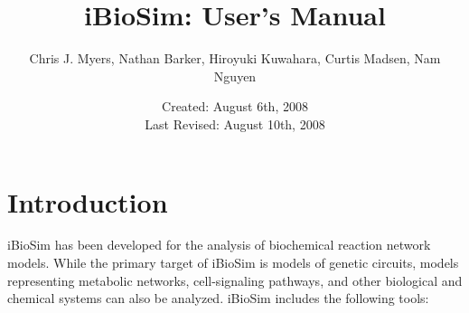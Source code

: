 \documentclass[titlepage,11pt]{article}
\title{iBioSim: User's Manual}
\author{Chris J. Myers, Nathan Barker, Hiroyuki Kuwahara, Curtis
  Madsen, Nam Nguyen}
\date{Created: August 6th, 2008\\
  Last Revised: August 10th, 2008
}
\begin{document}
\maketitle

  
\tableofcontents

\clearpage
  

\section{Introduction}

\noindent
iBioSim has been developed for the analysis of biochemical
reaction network models.  While the primary target of iBioSim is
models of genetic circuits, models representing metabolic
networks, cell-signaling pathways, and other biological and
chemical systems can also be analyzed.  iBioSim includes the
following tools: 
\end{document}
